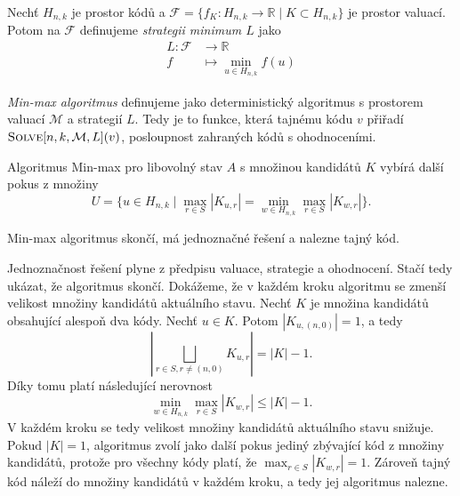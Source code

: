\begin{definice}
    Nechť $H_{n,k}$ je prostor kódů a $\mathcal{F} = \{f_K\colon H_{n,k} \to \mathbb{R} \mid K \subset H_{n,k}\}$ je prostor valuací. Potom na $\mathcal{F}$ definujeme \emph{strategii minimum $L$} jako
    \begin{align*}
        L \colon \mathcal{F} &\to \mathbb{R} \\
        f &\mapsto \min_{u\in H_{n,k}} f(u)
    \end{align*}
\end{definice}

\begin{definice}
    \emph{Min-max algoritmus} definujeme jako deterministický algoritmus s prostorem valuací $\mathcal{M}$ a strategií $L$. Tedy je to funkce, která tajnému kódu $v$ přiřadí $\textsc{Solve}[n, k, \mathcal{M}, L](v)$, posloupnost zahraných kódů s ohodnoceními.
\end{definice}



Algoritmus Min-max pro libovolný stav $A$ s množinou kandidátů $K$ vybírá další pokus z množiny
\[U = \{u \in H_{n,k} \mid \max_{r\in S} |K_{u,r}| = \min_{w \in H_{n,k}} \max_{r\in S} |K_{w,r}| \}.\]

\begin{tvrz}
    Min-max algoritmus skončí, má jednoznačné řešení a nalezne tajný kód. 
\end{tvrz}
\begin{dukaz}
    Jednoznačnost řešení plyne z předpisu valuace, strategie a ohodnocení. Stačí tedy ukázat, že algoritmus skončí. Dokážeme, že v každém kroku algoritmu se zmenší velikost množiny kandidátů aktuálního stavu. Nechť $K$ je množina kandidátů obsahující alespoň dva kódy. Nechť $u \in K$. Potom $|K_{u,(n,0)}| = 1$, a tedy 
    \[|\bigsqcup_{r\in S, r \neq (n,0)} K_{u,r} | = |K| - 1.\]
    Díky tomu platí následující nerovnost
    \[\min_{w \in H_{n,k}} \max_{r\in S} |K_{w,r}| \leq |K|-1.\]
    V každém kroku se tedy velikost množiny kandidátů aktuálního stavu snižuje. Pokud $|K| = 1$, algoritmus zvolí jako další pokus jediný zbývající kód z množiny kandidátů, protože pro všechny kódy platí, že
    $\max_{r\in S} |K_{w,r}| = 1$.
    Zároveň tajný kód náleží do množiny kandidátů v každém kroku, a tedy jej algoritmus nalezne. 
\end{dukaz}

